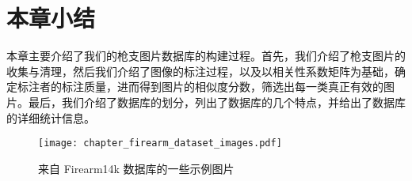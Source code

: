 \section{本章小结}
本章主要介绍了我们的枪支图片数据库的构建过程。首先，我们介绍了枪支图片的收集与清理，然后我们介绍了图像的标注过程，以及以相关性系数矩阵为基础，确定标注者的标注质量，进而得到图片的相似度分数，筛选出每一类真正有效的图片。最后，我们介绍了数据库的划分，列出了数据库的几个特点，并给出了数据库的详细统计信息。

\begin{figure}[!t]
	\centering
	\texttt{[image: chapter\_firearm\_dataset\_images.pdf]}
	\caption{来自 Firearm14k 数据库的一些示例图片}
	\label{fig:dataset_sample_images}
\end{figure}


